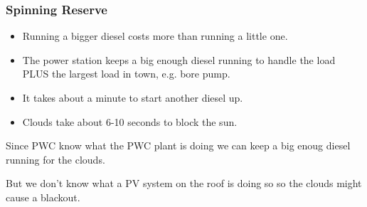 \documentclass{beamer}
\begin{document}
\begin{frame}\frametitle{Spinning Reserve}
  \begin{itemize}
  \item Running a bigger diesel costs more than running a little one.
  \item The power station keeps a big enough diesel running to handle
    the load PLUS the largest load in town, e.g. bore pump. 
  \item It takes about a minute to start another diesel up.
  \item Clouds take about 6-10 seconds to block the sun.
  \end{itemize}
  Since PWC know what the PWC plant is doing we can keep a big enoug
  diesel running for the clouds.

  But we don't know what a PV system on the roof is doing so
  so the clouds might cause a blackout.
\end{frame}
\end{document}
